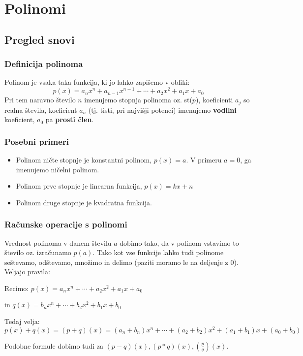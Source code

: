 \chapter{Polinomi}
\label{cha:polinomi}

\section{Pregled snovi}
\label{sec:polinomi-pregled-snovi}


\subsection{Definicija polinoma}
Polinom je vsaka taka funkcija, ki jo lahko zapišemo v obliki:
\[
p(x)=a_nx^n + a_{n-1}x^{n-1}+ \cdots + a_2x^2 + a_1 x + a_0
\]
Pri tem naravno število $n$ imenujemo stopnja polinoma oz. st($p$), koeficienti $ a_j$ so realna števila, koeficient $ a_n$ (tj. tisti, pri najvišji potenci) imenujemo \textbf{vodilni} koeficient, $ a_0$ pa \textbf{prosti člen}.
\subsection{Posebni primeri}
\begin{itemize}
\item Polinom ničte stopnje je konstantni polinom, $p(x)=a$. V primeru $a=0$, ga imenujemo ničelni polinom.
\item Polinom prve stopnje je linearna funkcija, $p(x)=kx + n$
\item Polinom druge stopnje je kvadratna funkcija.
\end{itemize}
\subsection{Računske operacije s polinomi}
Vrednost polinoma v danem številu $a$ dobimo tako, da v polinom vstavimo to število oz. izračunamo $p(a)$. 
Tako kot vse funkcije lahko tudi polinome seštevamo, odštevamo, množimo in delimo (paziti moramo le na deljenje z 0). Veljajo pravila:

Recimo: 
$ p(x)=a_nx^n + \cdots + a_2x^2 + a_1 x + a_0$ 

 in  
$ q(x)=b_nx^n + \cdots + b_2x^2 + b_1 x + b_0$ 

Tedaj velja:
$p(x) + q(x) = (p+q)(x) =(a_n + b_n)x^n +\cdots +(a_2 + b_2)x^2 +( a_1 + b_1) x + (a_0+b_0)$

Podobne formule dobimo tudi za $(p-q)(x), (p*q)(x), (\frac{p}{q})(x)$.
